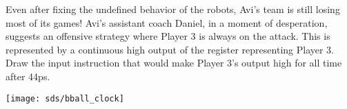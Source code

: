 \begin{blocksection}

\question
Even after fixing the undefined behavior of the robots, Avi's team is still losing most of its games! Avi's assistant coach Daniel, in a moment of desperation, suggests an offensive strategy where Player 3 is always on the attack. This is represented by a continuous high output of the register representing Player 3. Draw the input instruction that would make Player 3's output high for all time after 44ps.

\texttt{[image: sds/bball\_clock]}

\end{blocksection}